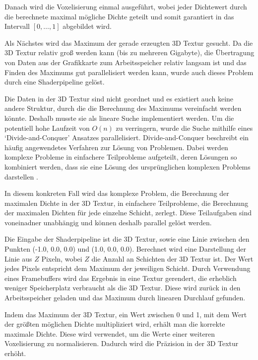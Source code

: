 \documentclass[a4paper,fontsize=12pt,toc=bib,halfparskip]{scrartcl}
\begin{document}
Danach wird die Voxelisierung einmal ausgef\"uhrt, wobei jeder Dichtewert durch die berechnete maximal m\"ogliche Dichte geteilt und somit garantiert in das Intervall $[0,\dots,1]$ abgebildet wird. 

Als N\"achstes wird das Maximum der gerade erzeugten 3D Textur gesucht. Da die 3D Textur relativ gro{\ss} werden kann (bis zu mehreren Gigabyte), die \"Ubertragung von Daten aus der Grafikkarte zum Arbeitsspeicher relativ langsam ist und das Finden des Maximums gut parallelisiert werden kann, wurde auch dieses Problem durch eine Shaderpipeline gel\"ost. 

Die Daten in der 3D Textur sind nicht geordnet und es existiert auch keine andere Struktur, durch die die Berechnung des Maximums vereinfacht werden k\"onnte. Deshalb musste sie als lineare Suche implementiert werden. Um die potentiell hohe Laufzeit von $O(n)$ zu verringern, wurde die Suche  mithilfe eines `Divide-and-Conquer' Ansatzes parallelisiert. Divide-and-Conquer beschreibt ein h\"aufig angewendetes Verfahren zur L\"osung von Problemen. Dabei werden komplexe Probleme in einfachere Teilprobleme aufgeteilt, deren L\"osungen so kombiniert werden, dass sie eine L\"osung des urspr\"unglichen komplexen Problems darstellen \cite{jordan1994hierarchical}.

In diesem konkreten Fall wird das komplexe Problem, die Berechnung der maximalen Dichte in der 3D Textur, in einfachere Teilprobleme, die Berechnung der maximalen Dichten f\"ur jede einzelne Schicht, zerlegt. Diese Teilaufgaben sind voneinadner unabh\"angig und k\"onnen deshalb parallel gel\"ost werden.

Die Eingabe der Shaderpipeline ist die 3D Textur, sowie eine Linie zwischen den Punkten (-1.0, 0.0, 0.0) und (1.0, 0.0, 0.0). Berechnet wird eine Darstellung der Linie aus $Z$ Pixeln, wobei $Z$ die Anzahl an Schichten der 3D Textur ist. Der Wert jedes Pixels entspricht dem Maximum der jeweiligen Schicht. Durch Verwendung eines Framebuffers wird das Ergebnis in eine Textur gerendert, die erheblich weniger Speicherplatz verbraucht als die 3D Textur. Diese wird zur\"uck in den Arbeitsspeicher geladen und das Maximum durch linearen Durchlauf gefunden.

Indem das Maximum der 3D Textur, ein Wert zwischen 0 und 1, mit dem Wert der gr\"o{\ss}ten m\"oglichen Dichte multipliziert wird, erh\"alt man die korrekte maximale Dichte. Diese wird verwendet, um die Werte einer weiteren Voxelisierung zu normalisieren. Dadurch wird die Pr\"azision in der 3D Textur erh\"oht.
\end{document}
